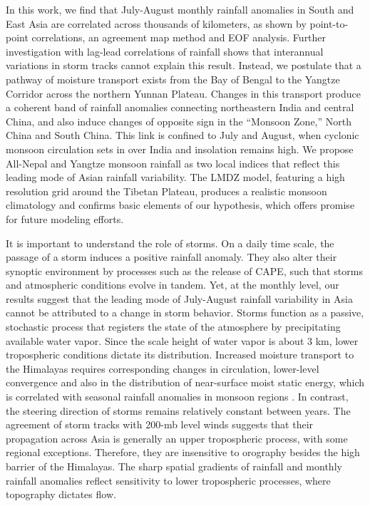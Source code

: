 	In this work, we find that July-August monthly rainfall anomalies in South and East Asia are correlated across thousands of kilometers, as shown by point-to-point correlations, an agreement map method and EOF analysis. Further investigation with lag-lead correlations of rainfall shows that interannual variations in storm tracks cannot explain this result. Instead, we postulate that a pathway of moisture transport exists from the Bay of Bengal to the Yangtze Corridor across the northern Yunnan Plateau. Changes in this transport produce a coherent band of rainfall anomalies connecting northeastern India and central China, and also induce changes of opposite sign in the ``Monsoon Zone,'' North China and South China. This link is confined to July and August, when cyclonic monsoon circulation sets in over India and insolation remains high. We propose All-Nepal and Yangtze monsoon rainfall as two local indices that reflect this leading mode of Asian rainfall variability. The LMDZ model, featuring a high resolution grid around the Tibetan Plateau, produces a realistic monsoon climatology and confirms basic elements of our hypothesis, which offers promise for future modeling efforts.
	
	It is important to understand the role of storms. On a daily time scale, the passage of a storm induces a positive rainfall anomaly. They also alter their synoptic environment by processes such as the release of CAPE, such that storms and atmospheric conditions evolve in tandem. Yet, at the monthly level, our results suggest that the leading mode of July-August rainfall variability in Asia cannot be attributed to a change in storm behavior. Storms function as a passive, stochastic process that registers the state of the atmosphere by precipitating available water vapor. Since the scale height of water vapor is about 3 km, lower tropospheric conditions dictate its distribution. Increased moisture transport to the Himalayas requires corresponding changes in circulation, lower-level convergence and also in the distribution of near-surface moist static energy, which is correlated with seasonal rainfall anomalies in monsoon regions \citep{Hurley2013}. In contrast, the steering direction of storms remains relatively constant between years. The agreement of storm tracks with 200-mb level winds suggests that their propagation across Asia is generally an upper tropospheric process, with some regional exceptions. Therefore, they are insensitive to orography besides the high barrier of the Himalayas. The sharp spatial gradients of rainfall and monthly rainfall anomalies reflect sensitivity to lower tropospheric processes, where topography dictates flow. 
		

